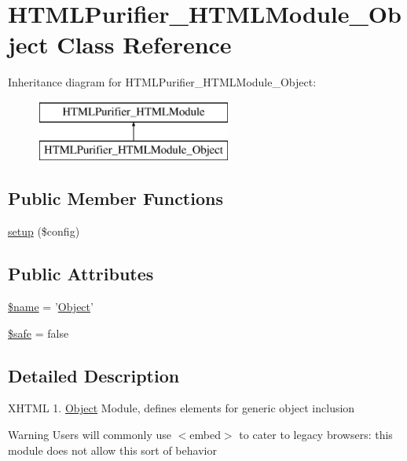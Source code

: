 \hypertarget{classHTMLPurifier__HTMLModule__Object}{\section{H\+T\+M\+L\+Purifier\+\_\+\+H\+T\+M\+L\+Module\+\_\+\+Object Class Reference}
\label{classHTMLPurifier__HTMLModule__Object}
}
Inheritance diagram for H\+T\+M\+L\+Purifier\+\_\+\+H\+T\+M\+L\+Module\+\_\+\+Object\+:\begin{figure}[H]
\begin{center}
\leavevmode
\includegraphics[height=2.000000cm]{classHTMLPurifier__HTMLModule__Object}
\end{center}
\end{figure}
\subsection*{Public Member Functions}
\begin{DoxyCompactItemize}
\item 
\hyperlink{classHTMLPurifier__HTMLModule__Object_a3f0b8245eeb5e4b07e0c3d78bf347c27}{setup} (\$config)
\end{DoxyCompactItemize}
\subsection*{Public Attributes}
\begin{DoxyCompactItemize}
\item 
\hyperlink{classHTMLPurifier__HTMLModule__Object_a4a413bfde22c550e39f70e53d3f784a8}{\$name} = '\hyperlink{classObject}{Object}'
\item 
\hyperlink{classHTMLPurifier__HTMLModule__Object_abecede9f689f8ff2e15be9d0cb85692a}{\$safe} = false
\end{DoxyCompactItemize}


\subsection{Detailed Description}
X\+H\+T\+M\+L 1. \hyperlink{classObject}{Object} Module, defines elements for generic object inclusion \begin{DoxyWarning}{Warning}
Users will commonly use $<$embed$>$ to cater to legacy browsers\+: this module does not allow this sort of behavior 
\end{DoxyWarning}


